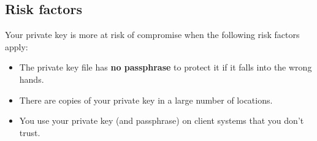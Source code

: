 \documentclass[slides]{pgnotes}
\begin{document}
\subsection{Risk factors}

Your private key is more at risk of compromise when the following risk factors apply:

\begin{itemize}
\item The private key file has \textbf{no passphrase} to protect it if it falls into the wrong hands.
\item There are copies of your private key in a large number of locations.
\item You use your private key (and passphrase) on client systems that you don't trust.
\end{itemize}
\end{document}
